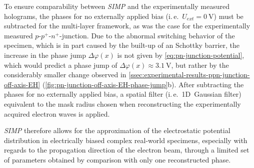To ensure comparability between \emph{SIMP} and the experimentally measured holograms, the phases for no externally applied bias (i.\,e.\ $U_{\mathit{ext}} = \SI{0}{\volt}$) must be subtracted for the multi-layer framework, as was the case for the experimentally measured $p$-$p^+$-$n^+$-junction. Due to the abnormal switching behavior of the specimen, which is in part caused by the built-up of an Schottky barrier, the increase in the phase jump $\Delta \varphi\left(x\right)$ is not given by \cref{eq:pn-junction-potential}, which would predict a phase jump of $\Delta \varphi\left(x\right) \approx \SI{3.1}{\volt}$, but rather by the considerably smaller change observed in \cref{ssec:experimental-results-ppn-junction-off-axis-EH} (\cref{fig:pn-junction-off-axis-EH-phase-jump}b). After subtracting the phases for no externally applied bias, a spatial filter (i.\,e.\ 1D~Gaussian filter) equivalent to the mask radius chosen when reconstructing the experimentally acquired electron waves is applied.

\emph{SIMP} therefore allows for the approximation of the electrostatic potential distribution in electrically biased complex real-world specimens, especially with regards to the propagation direction of the electron beam, through a limited set of parameters obtained by comparison with only one reconstructed phase.
